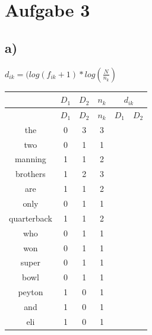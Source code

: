 \section*{Aufgabe 3}

\subsection*{a)}
$ d_{ik} = (log(f_{ik} +1 ) * log (\frac{N}{n_{k}}) $\\

\begin{tabular}{|c|c|c|c|c|c|}
 & $D_{1}$ & $D_{2}$ & $n_{k}$ & \multicolumn{2}{c}{$d_{ik}$} \\ 
\hline 
 & $D_{1}$ & $D_{2}$ & $n_{k}$ & $D_{1}$ & $D_{2}$ \\ 
\hline 
the & 0 & 3 & 3 &  \\ 
\hline 
two & 0 & 1 & 1 &  \\ 
\hline 
manning & 1 & 1 & 2 &  \\ 
\hline 
brothers & 1 & 2 & 3 &  \\ 
\hline 
are & 1 & 1 & 2 & \\ 
\hline 
only & 0 & 1 & 1 &  \\ 
\hline 
quarterback & 1 & 1 & 2 &  \\ 
\hline 
who & 0 & 1 & 1 &  \\ 
\hline 
won & 0 & 1 & 1 &  \\ 
\hline 
super & 0 & 1 & 1 &  \\ 
\hline 
bowl & 0 & 1 & 1 &  \\ 
\hline 
peyton & 1 & 0 & 1 &  \\ 
\hline 
and & 1 & 0 & 1 &  \\ 
\hline 
eli & 1 & 0 & 1 &  \\ 
\hline 
\end{tabular} 
